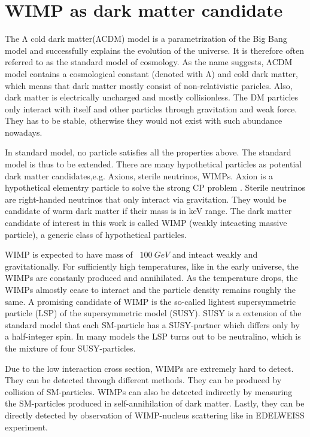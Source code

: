 \section{WIMP as dark matter candidate}
The $\mathrm{\Lambda}$ cold dark matter($\mathrm{\Lambda}$CDM) model is a parametrization of the Big Bang model and successfully explains the evolution of the universe. It is therefore often referred to as the standard model of cosmology. As the name suggests, $\mathrm{\Lambda}$CDM model contains a cosmological constant (denoted with $\mathrm{\Lambda}$) and cold dark matter, which means that dark matter mostly consist of non-relativistic paricles. Also, dark matter is electrically uncharged and mostly collisionless. The DM particles only interact with itself and other particles through gravitation and weak force. They has to be stable, otherwise they would not exist with such abundance nowadays.

In standard model, no particle satisfies all the properties above. The standard model is thus to be extended. There are many hypothetical particles as potential dark matter candidates,e.g. Axions, sterile neutrinos, WIMPs. Axion is a hypothetical elementry particle to solve the strong CP problem \cite{Pec77}. Sterile neutrinos are right-handed neutrinos that only interact via gravitation. They would be candidate of warm dark matter if their mass is in keV range. The dark matter candidate of interest in this work is called WIMP (weakly inteacting massive particle), a generic class of hypothetical particles.

WIMP is expected to have mass of ~$\SI{100}{GeV}$ and inteact weakly and gravitationally.  For sufficiently high temperatures, like in the early universe, the WIMPs are constanly produced and annihilated. As the temperature drops, the WIMPs almostly cease to interact and the particle density remains roughly the same. A promising candidate of WIMP is the so-called lightest supersymmetric particle (LSP) of the supersymmetric model (SUSY). SUSY is a extension of the standard model that each SM-particle has a SUSY-partner which differs only by a half-integer spin. In many models the LSP turns out to be neutralino, which is the mixture of four SUSY-particles.

Due to the low interaction cross section, WIMPs are extremely hard to detect. They can be detected through different methods. They can be produced by collision of SM-particles. WIMPs can also be detected indirectly by measuring the SM-particles produced in self-annihilation of dark matter. Lastly, they can be directly detected by observation of WIMP-nucleus scattering like in EDELWEISS experiment.

